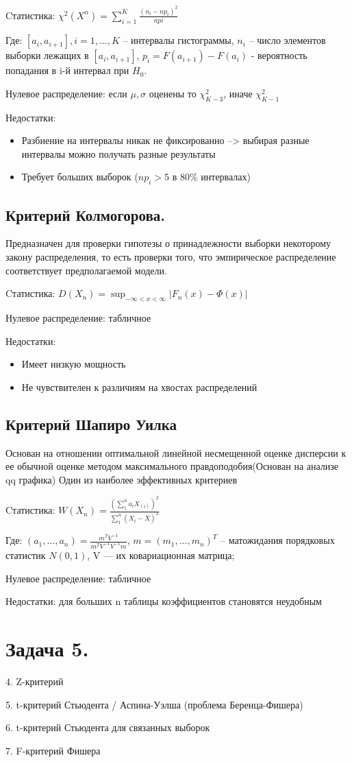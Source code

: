 \documentclass[10pt,reqno]{amsart}
\theoremstyle{definition}
\theoremstyle{remark}
\newcommand{\lfrac} [2] {\displaystyle \frac{#1}{#2}}
\begin{document}
Cтатистика: $\chi^2(X^n) = \sum_{i = 1}^{K} \lfrac{(n_i - np_i)^2}{npi}$


Где: $[a_i, a_{i+1}], i=1,...,K$ -- интервалы гистограммы, $n_i$ -- число элементов выборки лежащих в $[a_i, a_{i+1}]$, $p_i = F(a_{i + 1}) - F(a_i)$ - вероятность попадания в i-й интервал при $H_0$.


Нулевое распределение: если $\mu, \sigma$ оценены то $\chi^2_{K-3}$, иначе $\chi^2_{K-1}$


Недостатки:
\begin{itemize}
\item Разбиение на интервалы никак не фиксированно --> выбирая разные интервалы можно получать разные результаты
\item Требует больших выборок ($np_i > 5$ в $80\%$ интервалах)
\end{itemize}


\subsection*{Критерий Колмогорова.}

Предназначен для проверки гипотезы о принадлежности выборки некоторому закону распределения, то есть проверки того, что эмпирическое распределение соответствует предполагаемой модели.

Cтатистика: $D(X_n) = \sup_{-\infty < x < \infty} |F_n(x) - \Phi(x)|$

Нулевое распределение: табличное

Недостатки:
\begin{itemize}
\item Имеет низкую мощность
\item Не чувствителен к различиям на хвостах распределений
\end{itemize}

\subsection*{Критерий Шапиро Уилка}
Основан на отношении оптимальной линейной несмещенной оценке дисперсии к ее обычной оценке методом максимального правдоподобия(Основан на анализе qq графика)
Один из наиболее эффективных критериев


Cтатистика: $W(X_n) = \lfrac{\left(\sum_1^n a_i X_{(i)}\right)^2}{\sum_1^n (X_i - \overline{X})^2}$

Где: $(a_1,...,a_n) = \lfrac{m^TV^{-1}}{m^TV^{-1}V^{-1}m}$, $m = (m_1,...,m_n)^T$ -- матожидания порядковых статистик $N(0, 1)$, V — их ковариационная матрица;

Нулевое распределение: табличное

Недостатки: для больших n таблицы коэффициентов становятся неудобным

\section*{Задача 5.}
4. Z-критерий

5. t-критерий Стьюдента / Аспина-Уэлша (проблема Беренца-Фишера)

6. t-критерий Стьюдента для связанных выборок

7. F-критерий Фишера
\end{document}
